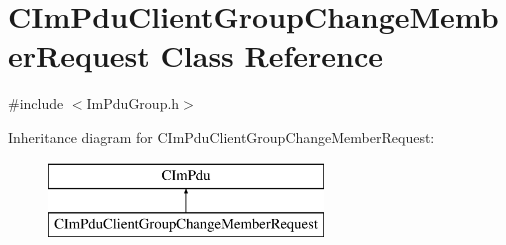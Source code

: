 \hypertarget{class_c_im_pdu_client_group_change_member_request}{}\section{C\+Im\+Pdu\+Client\+Group\+Change\+Member\+Request Class Reference}
\label{class_c_im_pdu_client_group_change_member_request}


{\ttfamily \#include $<$Im\+Pdu\+Group.\+h$>$}

Inheritance diagram for C\+Im\+Pdu\+Client\+Group\+Change\+Member\+Request\+:\begin{figure}[H]
\begin{center}
\leavevmode
\includegraphics[height=2.000000cm]{class_c_im_pdu_client_group_change_member_request}
\end{center}
\end{figure}
